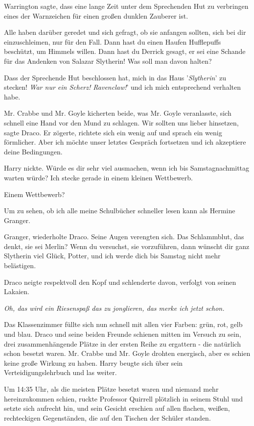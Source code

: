 \glqq Warrington sagte, dass eine lange Zeit unter dem Sprechenden Hut zu
verbringen eines der Warnzeichen für einen großen dunklen Zauberer ist.

Alle haben darüber geredet und sich gefragt, ob sie anfangen sollten, sich bei
dir einzuschleimen, nur für den Fall. Dann hast du einen Haufen Hufflepuffs
beschützt, um Himmels willen. Dann hast du Derrick gesagt, er sei eine Schande
für das Andenken von Salazar Slytherin! Was soll man davon halten?\grqq{}

\glqq Dass der Sprechende Hut beschlossen hat, mich in das Haus
'\emph{Slytherin}' zu stecken! \emph{War nur ein Scherz! Ravenclaw!}' und ich
mich entsprechend verhalten habe.\grqq{}

Mr. Crabbe und Mr. Goyle kicherten beide, was Mr. Goyle veranlasste, sich
schnell eine Hand vor den Mund zu schlagen. \glqq Wir sollten uns lieber
hinsetzen\grqq{}, sagte Draco. Er zögerte, richtete sich ein wenig auf und
sprach ein wenig förmlicher. \glqq Aber ich möchte unser letztes Gespräch
fortsetzen und ich akzeptiere deine Bedingungen.\grqq{}

Harry nickte. \glqq Würde es dir sehr viel ausmachen, wenn ich bis
Samstagnachmittag warten würde? Ich stecke gerade in einem kleinen
Wettbewerb.\grqq{}

\glqq Einem Wettbewerb?\grqq{}

\glqq Um zu sehen, ob ich alle meine Schulbücher schneller lesen kann als
Hermine Granger.\grqq{}

\glqq Granger\grqq{}, wiederholte Draco. Seine Augen verengten sich. \glqq Das
Schlammblut, das denkt, sie sei Merlin? Wenn du versuchst, sie vorzuführen, dann
wünscht dir ganz Slytherin viel Glück, Potter, und ich werde dich bis Samstag
nicht mehr belästigen.\grqq{}

Draco neigte respektvoll den Kopf und schlenderte davon, verfolgt von seinen
Lakaien.

\emph{Oh, das wird ein Riesenspaß das zu jonglieren, das merke ich jetzt schon.}

Das Klassenzimmer füllte sich nun schnell mit allen vier Farben: grün, rot, gelb
und blau. Draco und seine beiden Freunde schienen mitten im Versuch zu sein,
drei zusammenhängende Plätze in der ersten Reihe zu ergattern - die natürlich
schon besetzt waren. Mr. Crabbe und Mr. Goyle drohten energisch, aber es schien
keine große Wirkung zu haben. Harry beugte sich über sein Verteidigungslehrbuch
und las weiter.

Um 14:35 Uhr, als die meisten Plätze besetzt waren und niemand mehr
hereinzukommen schien, ruckte Professor Quirrell plötzlich in seinem Stuhl und
setzte sich aufrecht hin, und sein Gesicht erschien auf allen flachen, weißen,
rechteckigen Gegenständen, die auf den Tischen der Schüler standen.

